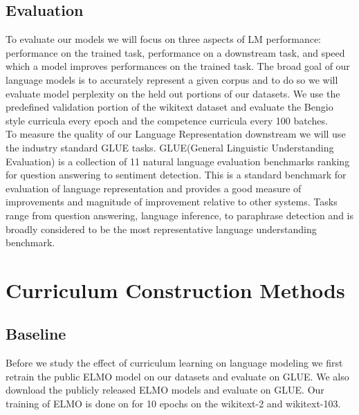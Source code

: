 \subsection{Evaluation}
To evaluate our models we will focus on three aspects of LM performance: performance on the trained task, performance on a downstream task, and speed which a model improves performances on the trained task. The broad goal of our language models is to accurately represent a given corpus and to do so we will evaluate model perplexity on the held out portions of our datasets. We use the predefined validation portion of the wikitext dataset and evaluate the Bengio style curricula every epoch and the competence curricula every 100 batches. \\
To measure the quality of our Language Representation downstream we will use the industry standard GLUE tasks. GLUE(General Linguistic Understanding Evaluation) \cite{Wang2018GLUEAM} is a collection of 11 natural language evaluation benchmarks ranking for question answering to sentiment detection. This is a standard benchmark for evaluation of language representation and provides a good measure of improvements and magnitude of improvement relative to other systems. Tasks range from question answering, language inference, to paraphrase detection and is broadly considered to be the most representative language understanding benchmark.
\section{Curriculum Construction Methods}
\subsection{Baseline}
Before we study the effect of curriculum learning on language modeling we first retrain the public ELMO model on our datasets and evaluate on GLUE. We also download the publicly released ELMO models and evaluate on GLUE. Our training of ELMO is done on for 10 epochs on the wikitext-2 and wikitext-103.

